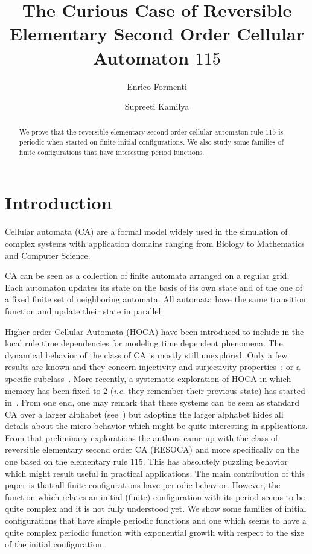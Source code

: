 \documentclass[submission,copyright,creativecommons]{eptcs}
\title{The Curious Case of Reversible Elementary Second Order Cellular Automaton $115$}
\author{Enrico Formenti
\institute{Universit\'e C\^ote d'Azur, CNRS, i3s\\ Nice, France}
\email{enrico.formenti@univ-cotedazur.fr}
\and
Supreeti Kamilya
\institute{Department of Computer Science and Engineering,\\ Birla Institute of Technology, Mesra, Ranchi, India}
\email{supreeti.kamilya17@bitmesra.ac.in}
}
\makeatletter
\newcommand{\ie}{\emph{i.e.}\@\xspace}
\makeatother
\begin{document}
\maketitle

\begin{abstract}
We prove that the reversible elementary second order cellular automaton rule $115$
is periodic when started on finite initial configurations. We also study some families of finite configurations that have interesting period functions.
\end{abstract}
\section{Introduction}
%
Cellular automata (CA) are a formal model widely
used in the simulation of complex systems
with application domains ranging from Biology
to Mathematics and Computer Science. 

CA can be seen as a collection of finite automata
arranged on a regular grid. Each automaton
updates its state on the basis of its own state and of the one of a fixed finite set of
neighboring automata. All automata have the same transition function and update their
state in parallel.

Higher order Cellular Automata (HOCA) have
been introduced to include in the local rule
time dependencies for modeling time dependent phenomena. The dynamical behavior
of the class of CA is mostly still unexplored. Only a few results are known and they concern injectivity and surjectivity
properties~\cite{bruyn1991,kari2000}; or a specific subclass~\cite{DennunzioFMMP19}. More recently, a systematic exploration
of HOCA in which memory has been fixed to
$2$ (\ie they remember their previous state)
has started in~\cite{formenti2024elementary}. From one end, one may remark that these systems can be seen as standard CA over a larger alphabet (see~\cite{DennunzioFMMP19}) but
adopting the larger alphabet hides all details about the micro-behavior which might be quite interesting in applications.
From that preliminary explorations the authors came up with the class of reversible elementary second order CA (RESOCA) and more specifically on the one based on the elementary rule $115$. This has absolutely puzzling behavior which might result useful
in practical applications. The main contribution of this paper is that all finite configurations have periodic behavior. However, the function which relates an initial (finite) configuration with its period seems to be quite complex and it is not fully understood yet. We show some families of initial configurations that have simple periodic functions and one which seems to have a quite complex periodic function with exponential growth with respect to the size of the initial
configuration.
\smallskip
\end{document}

